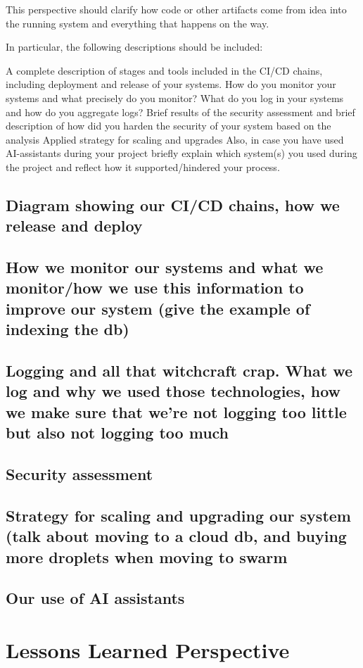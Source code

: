 \documentclass{article}
\begin{document}
This perspective should clarify how code or other artifacts come from idea into the running system and everything that happens on the way.

In particular, the following descriptions should be included:

A complete description of stages and tools included in the CI/CD chains, including deployment and release of your systems.
How do you monitor your systems and what precisely do you monitor?
What do you log in your systems and how do you aggregate logs?
Brief results of the security assessment and brief description of how did you harden the security of your system based on the analysis
Applied strategy for scaling and upgrades
Also, in case you have used AI-assistants during your project briefly explain which system(s) you used during the project and reflect how it supported/hindered your process.

\subsection{Diagram showing our CI/CD chains, how we release and deploy}
\subsection{How we monitor our systems and what we monitor/how we use this information to improve our system (give the example of indexing the db)}
\subsection{Logging and all that witchcraft crap. What we log and why we used those technologies, how we make sure that we're not logging too little but also not logging too much}
\subsection{Security assessment}
\subsection{Strategy for scaling and upgrading our system (talk about moving to a cloud db, and buying more droplets when moving to swarm}
\subsection{Our use of AI assistants}

\section{Lessons Learned Perspective}
\end{document}
